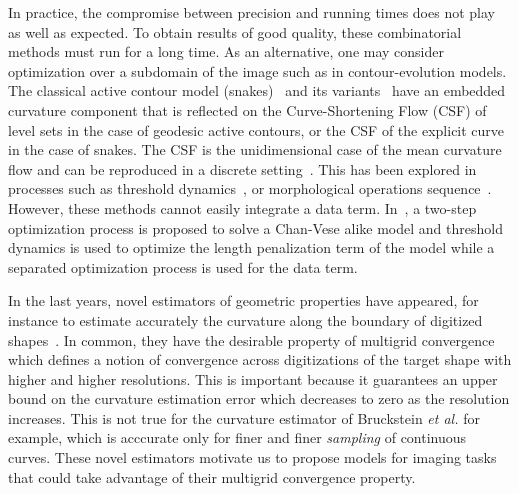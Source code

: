 \documentclass{siamart220329}
\begin{document}
In practice, the compromise between precision and running times does not play as
well as expected. To obtain results of good quality, these combinatorial methods
must run for a long time. As an alternative, one may consider optimization over
a subdomain of the image such as in contour-evolution models. The classical
active contour model (snakes)~\cite{kass1988snakes} and its
variants~\cite{caseles97geodesic,chan01} have an embedded curvature component
that is reflected on the Curve-Shortening Flow (CSF) of level sets in the case
of geodesic active contours, or the CSF of the explicit curve in the case of
snakes. The CSF is the unidimensional case of the mean curvature flow and can be
reproduced in a discrete setting~\cite{merriman1992diffusion}. This has been
explored in processes such as threshold
dynamics~\cite{esedoglu2005threshold,esedoglu2008threshold}, or morphological
operations sequence~\cite{marquezneila14}. However, these methods cannot easily
integrate a data term. In~\cite{wang2017efficient}, a two-step optimization 
process is proposed to solve a Chan-Vese alike model and threshold dynamics is 
used to optimize the length penalization term of the model while a separated 
optimization process is used for the data term.

In the last years, novel estimators of geometric properties have appeared, for
instance to estimate accurately the curvature along the boundary of digitized
shapes~\cite{roussillon11mdca,schindele17mdca,coeurjolly13integral,coeurjolly12multigrid}.
In common, they have the desirable property of multigrid convergence which
defines a notion of convergence across digitizations of the target shape with
higher and higher resolutions. This is important because it guarantees an upper
bound on the curvature estimation error which decreases to zero as the
resolution increases. This is not true for the curvature estimator of Bruckstein
{\em et al.} \cite{bruckstein01convergence} for example, which is acccurate only
for finer and finer {\em sampling} of continuous curves. These novel estimators
motivate us to propose models for imaging tasks that could take advantage of
their multigrid convergence property.
%
%
%
%
\end{document}
